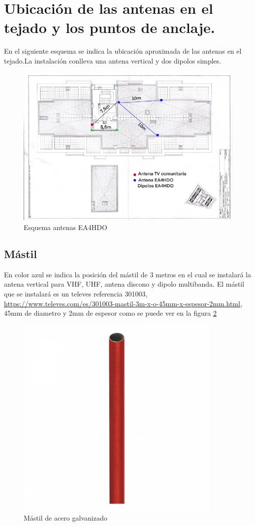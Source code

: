 \documentclass[letterpaper, 10pt]{article} %
\begin{document}
\section{Ubicación de las antenas en el tejado y los puntos de anclaje.}
En el siguiente esquema se indica la ubicación aproximada de las antenas en el tejado.La instalación conlleva una antena vertical y dos dipolos simples.
\begin{figure}[h!]
\centering
\includegraphics[clip, width=17cm]{img/planoAntenas.pdf}
\caption{Esquema antenas EA4HDO}
\label{fig:esquema}
\end{figure}

\subsection{Mástil}
En color azul se indica la posición del mástil de 3 metros en el cual se instalará la antena vertical para VHF, UHF, antena discono y dipolo multibanda. 
El mástil que se instalará es un televes referencia 301003, \url{https://www.televes.com/es/301003-mastil-3m-x-o-45mm-x-espesor-2mm.html}, 45mm de diametro y 2mm de espesor como se puede ver en la figura \ref{fig:mastil}

\begin{figure}[h!]
	\centering
	\includegraphics[width=10cm]{img/mastil.pdf}
	\caption{Mástil de acero galvanizado}
	\label{fig:mastil}
\end{figure}
\end{document}
